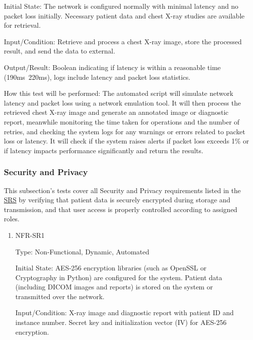 \documentclass[12pt, titlepage]{article}
\begin{document}
\begin{enumerate}
\begin{enumerate}
Initial State: The network is configured normally with minimal latency and no packet loss initially. Necessary patient data and chest X-ray studies are available for retrieval.

Input/Condition: Retrieve and process a chest X-ray image, store the processed result, and send the data to external.

Output/Result: Boolean indicating if latency is within a reasonable time (190ms~220ms), logs include latency and packet loss statistics.

How this test will be performed: The automated script will simulate network latency and packet loss using a network emulation tool. It will then process the retrieved chest X-ray image and generate an annotated image or diagnostic report, meanwhile monitoring the time taken for operations and the number of retries, and checking the system logs for any warnings or errors related to packet loss or latency. It will check if the system raises alerts if packet loss exceeds 1\% or if latency impacts performance significantly and return the results.

\end{enumerate}

\subsubsection{Security and Privacy}

This subsection's tests cover all Security and Privacy requirements listed in the \href{https://github.com/RezaJodeiri/CXR-Capstone/blob/main/docs/SRS/SRS.pdf}{SRS} \citep{SRS}
 by verifying that patient data is securely encrypted during storage and transmission, and that user access is properly controlled according to assigned roles.

\begin{enumerate}

\item{NFR-SR1}\label{NFR-SR1}

Type: Non-Functional, Dynamic, Automated

Initial State: AES-256 encryption libraries (such as OpenSSL or Cryptography in Python) are configured for the system. Patient data (including DICOM images and reports) is stored on the system or transmitted over the network.

Input/Condition: X-ray image and diagnostic report with patient ID and instance number. Secret key and initialization vector (IV) for AES-256 encryption.


\end{enumerate}
\end{enumerate}
\end{document}
